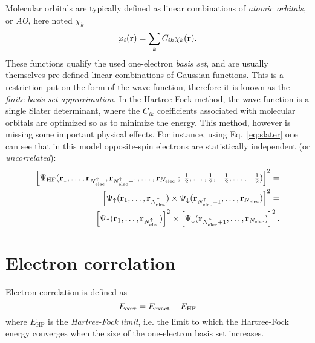 \documentclass[./thesis.tex]{subfiles}
\begin{document}
Molecular orbitals are typically defined as linear combinations of \emph{atomic orbitals}, or \emph{AO}, here noted $\chi_k$
\begin{equation}
 \varphi_i({\bf r}) = \sum_k C_{ik} \chi_k({\bf r}).
\label{eq:def_mo}
\end{equation}
These functions qualify the used one-electron \emph{basis set}, and are usually themselves pre-defined linear combinations of Gaussian functions. This is a restriction put on the form of the wave function, therefore it is known as the \emph{finite basis set approximation}.
In the Hartree-Fock method, the wave function is a single Slater determinant, where the $C_{ik}$ coefficients associated with molecular orbitals are optimized so as to minimize the energy.
This method, however is missing some important physical effects. For instance, using Eq.~\eqref{eq:slater} one can see that in this model opposite-spin electrons are statistically independent (or \emph{uncorrelated}):
\begin{equation}
\begin{split}
\left[ \Psi_\textrm{HF}({\bf r}_1,\dots,{\bf r}_{{N_\text{elec}^{\uparrow}}},{\bf r}_{{N_\text{elec}^{\uparrow}}+1},\dots,{\bf r}_{N_\text{elec}} \; ; \;
      \tfrac{1}{2},\dots,\tfrac{1}{2},-\tfrac{1}{2},\dots,-\tfrac{1}{2}) \right]^2 = \\
\left[ \Psi_\uparrow({\bf r}_1,\dots,{\bf r}_{{N_\text{elec}^{\uparrow}}}) \times \Psi_\downarrow({\bf r}_{{N_\text{elec}^{\uparrow}}+1},\dots,{\bf r}_{N_\text{elec}}) \right]^2 = \\
\left[ \Psi_\uparrow({\bf r}_1,\dots,{\bf r}_{{N_\text{elec}^{\uparrow}}}) \right]^2 \times \left[ \Psi_\downarrow({\bf r}_{{N_\text{elec}^{\uparrow}}+1},\dots,{\bf r}_{N_\text{elec}}) \right]^2.
\end{split}
\end{equation}

\section{Electron correlation}

Electron correlation is defined as\cite{Lowdin_1959}
\begin{equation}
E_\text{corr} = E_\text{exact} - E_\text{HF}
\end{equation}
where $E_\text{HF}$ is the \emph{Hartree-Fock limit}, i.e. the limit to which the Hartree-Fock energy converges when the size of the one-electron basis set increases.
\end{document}
